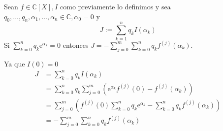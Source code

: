 \begin{cajita}
    \begin{lema}
Sean $f \in \mathbb{C}[X], I$ como previamente lo definimos y sea $ q_0, \ldots, q_n, \alpha_1, \ldots, \alpha_n \in \mathbb{C}, \alpha_0=0$ y 
$$
J:=\sum_{k=1}^n q_k I\left(\alpha_k\right)
$$
Si $\sum_{k=0}^n q_k \mathrm{e}^{\alpha_k}=0$ entonces $J=-\sum_{j=0}^{m} \sum_{k=0}^n q_k f^{(j)}\left(\alpha_k\right)$.
\begin{dem}
    Ya que $I(0)=0$
$$
\begin{aligned}
J &=\sum_{k=0}^n q_k I\left(\alpha_k\right) \\
&=\sum_{k=0}^n q_k \sum_{j=0}^{m}\left(\mathrm{e}^{\alpha_k} f^{(j)}(0)-f^{(j)}\left(\alpha_k\right)\right) \\
&=\sum_{j=0}^{m}\left(f^{(j)}(0) \sum_{k=0}^n q_k \mathrm{e}^{\alpha_k}-\sum_{k=0}^n q_k f^{(j)}\left(\alpha_k\right)\right) \\
&=-\sum_{j=0}^{m} \sum_{k=0}^n q_k f^{(j)}\left(\alpha_k\right)
\end{aligned}
$$
\end{dem}

    \end{lema}
\end{cajita}

